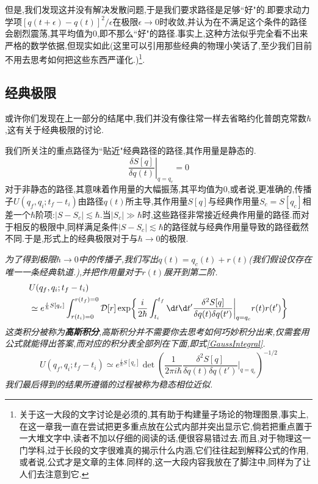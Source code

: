 但是,我们发现这并没有解决发散问题,于是我们要求路径是足够``好"的.即要求动力学项$[q(t+\epsilon)-q(t)]^2/\epsilon$在极限$\epsilon\to0$时收敛,并认为在不满足这个条件的路径会剧烈震荡,其平均值为$ 0 $,即不那么``好"的路径.事实上,这种方法似乎完全看不出来严格的数学依据,但现实如此(这里可以引用那些经典的物理小笑话了,至少我们目前不用去思考如何把这些东西严谨化.)\footnote{关于这一大段的文字讨论是必须的,其有助于构建量子场论的物理图景,事实上,在这一章我一直在尝试把更多重点放在公式内部并突出显示它,倘若把重点置于一大堆文字中,读者不加以仔细的阅读的话,便很容易错过去.而且,对于物理这一门学科,过于长段的文字很难真的揭示什么内涵,它们往往起到解释公式的作用,或者说,公式才是文章的主体.同样的,这一大段内容我放在了脚注中,同样为了让人们去注意到它.}.

\subsection*{经典极限}
或许你们发现在上一部分的结尾中,我们并没有像往常一样去省略约化普朗克常数$\hbar$,这有关于经典极限的讨论.

我们所关注的重点路径为``贴近"经典路径的路径,其作用量是静态的.
\begin{equation}
	\left.\frac{\delta S[q]}{\delta q(t)}\right|_{q=q_c}=0
\end{equation}
对于非静态的路径,其意味着作用量的大幅振荡,其平均值为0,或者说,更准确的,传播子$U(q_f,q_i;t_f-t_i)$由路径$q(t)$所主导,其作用量$S[q]$与经典作用量$S_c=S[q_c]$相差一个$\hbar$阶项:$|S-S_c|\lesssim\hbar$.当$|S_c|\gg\hbar $时,这些路径非常接近经典作用量的路径.而对于相反的极限中,同样满足条件$|S-S_c|\lesssim\hbar$的路径就与经典作用量导致的路径截然不同.于是,形式上的经典极限对于与$\hbar\to0$的极限.

\begin{remark}
		\textit{为了得到极限$\hbar\to0$中的传播子,我们写出$q(t)=q_c(t)+r(t)$(我们假设仅存在唯一一条经典轨道.),并把作用量对于$r(t)$展开到第二阶.}
		\begin{equation}
			\begin{aligned}&U(q_f,q_i;t_f-t_i)\\&\simeq e^{\frac{i}{\hbar}S[q_c]}\int_{r(t_i)=0}^{r(t_f)=0}\mathcal{D}[r]\exp\biggl\{\frac{i}{2\hbar}\int_{t_i}^{t_f}\d t \d t' \frac{\delta^2S[q]}{\delta q(t)\delta q(t')}\biggr|_{q=q_c}r(t)r(t')\biggr\}\end{aligned}
		\end{equation}
		\textit{这类积分被称为\textbf{高斯积分},高斯积分并不需要你去思考如何巧妙积分出来,仅需套用公式就能得出答案,而对应的积分表全部列在下面,即式\ref{GaussIntegral}.}
		\begin{equation}
			U(q_f,q_i;t_f-t_i)\simeq e^{\frac{i}{\hbar}S[q_c]}\det\left(\frac{1}{2\pi i\hbar}\frac{\delta^2S[q]}{\delta q(t)\delta q(t')}\bigg|_{q=q_c}\right)^{-1/2}
		\end{equation}
		\textit{我们最后得到的结果所遵循的过程被称为稳态相位近似.}
\end{remark}
